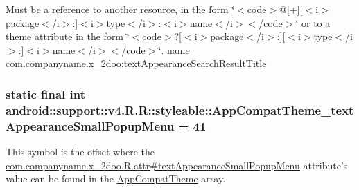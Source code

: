 Must be a reference to another resource, in the form \char`\"{}$<$code$>$@\mbox{[}+\mbox{]}\mbox{[}$<$i$>$package$<$/i$>$:\mbox{]}$<$i$>$type$<$/i$>$:$<$i$>$name$<$/i$>$$<$/code$>$\char`\"{} or to a theme attribute in the form \char`\"{}$<$code$>$?\mbox{[}$<$i$>$package$<$/i$>$:\mbox{]}\mbox{[}$<$i$>$type$<$/i$>$:\mbox{]}$<$i$>$name$<$/i$>$$<$/code$>$\char`\"{}.  name \hyperlink{namespacecom_1_1companyname_1_1x__2doo}{com.companyname.x\_\-2doo}:textAppearanceSearchResultTitle \hypertarget{classandroid_1_1support_1_1v4_1_1_r_1_1styleable_49d918bd91325c5f25bb709c1dfaf57c}{
\subsubsection[{AppCompatTheme\_\-textAppearanceSmallPopupMenu}]{\setlength{\rightskip}{0pt plus 5cm}static final int android::support::v4.R.R::styleable::AppCompatTheme\_\-textAppearanceSmallPopupMenu = 41}}
\label{classandroid_1_1support_1_1v4_1_1_r_1_1styleable_49d918bd91325c5f25bb709c1dfaf57c}


This symbol is the offset where the \hyperlink{classcom_1_1companyname_1_1x__2doo_1_1_r_1_1attr_f1663eed3dbdfc28b318623f565e4b0d}{com.companyname.x\_\-2doo.R.attr\#textAppearanceSmallPopupMenu} attribute's value can be found in the \hyperlink{classandroid_1_1support_1_1v4_1_1_r_1_1styleable_0873e92ba21076bb5a4aeadeb7f5779f}{AppCompatTheme} array.

